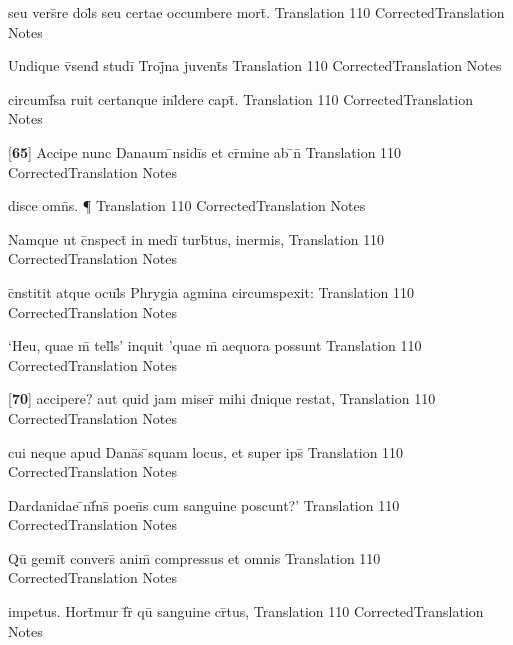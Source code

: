 \latline
  {seu vers\={}re dol\={}s seu certae occumbere mort\={\macron {\i}}.}
  { Translation }
  {110}
  { CorrectedTranslation }
  { Notes }


\latline
  {Undique v\={\macron {\i}}send\={\macron {\i}} studi\={} Troj\={}na juvent\={}s}
  { Translation }
  {110}
  { CorrectedTranslation }
  { Notes }


\latline
  {circumf\={}sa ruit certanque inl\={}dere capt\={}.}
  { Translation }
  {110}
  { CorrectedTranslation }
  { Notes }


\latline
  {[\textbf{65}] Accipe nunc Danaum \={\macron {\i}}nsidi\={}s et cr\={\macron {\i}}mine ab \={}n\={}}
  { Translation }
  {110}
  { CorrectedTranslation }
  { Notes }


\latline
  {disce omn\={\macron {\i}}s. \P}
  { Translation }
  {110}
  { CorrectedTranslation }
  { Notes }


\latline
  {Namque ut c\={}nspect\={} in medi\={} turb\={}tus, inermis, }
  { Translation }
  {110}
  { CorrectedTranslation }
  { Notes }


\latline
  {c\={}nstitit atque ocul\={\macron {\i}}s Phrygia agmina circumspexit:}
  { Translation }
  {110}
  { CorrectedTranslation }
  { Notes }


\latline
  {`Heu, quae m\={} tell\={}s' inquit 'quae m\={} aequora possunt}
  { Translation }
  {110}
  { CorrectedTranslation }
  { Notes }


\latline
  {[\textbf{70}] accipere? aut quid jam miser\={} mihi d\={}nique restat,}
  { Translation }
  {110}
  { CorrectedTranslation }
  { Notes }


\latline
  {cui neque apud Dana\={}s \={}squam locus, et super ips\={\macron {\i}}}
  { Translation }
  {110}
  { CorrectedTranslation }
  { Notes }


\latline
  {Dardanidae \={\macron {\i}}nf\={}ns\={\macron {\i}} poen\={}s cum sanguine poscunt?'}
  { Translation }
  {110}
  { CorrectedTranslation }
  { Notes }


\latline
  {Qu\={} gemit\={} convers\={\macron {\i}} anim\={\macron {\i}} compressus et omnis}
  { Translation }
  {110}
  { CorrectedTranslation }
  { Notes }


\latline
  {impetus.  Hort\={}mur f\={}r\={\macron {\i}} qu\={} sanguine cr\={}tus,}
  { Translation }
  {110}
  { CorrectedTranslation }
  { Notes }


